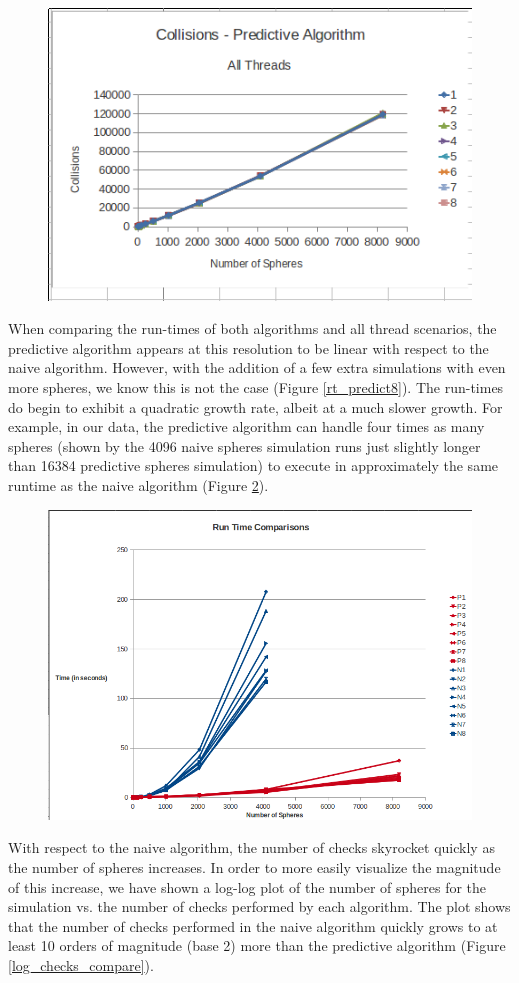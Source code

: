 \documentclass[CEJCS,PDF]{cej} %
\begin{document}
\begin{center}
\begin{figure}
	\includegraphics[width=.45\textwidth]{collisions_predictive_allthreads.png}
	\label{col_predict8}
\end{figure}
\end{center}

When comparing the run-times of both algorithms and all thread scenarios, the predictive algorithm appears at this resolution to be linear with respect to the naive algorithm.  However, with the addition of a few extra simulations with even more spheres, we know this is not the case (Figure \ref{rt_predict8}).  The run-times do begin to exhibit a quadratic growth rate, albeit at a much slower growth.  For example, in our data, the predictive algorithm can handle four times as many spheres (shown by the 4096 naive spheres simulation runs just slightly longer than 16384 predictive spheres simulation) to execute in approximately the same runtime as the naive algorithm (Figure \ref{rt_compare}).

\begin{center}
\begin{figure}
	\includegraphics[width=.45\textwidth]{runtime_comparison.png}
	\label{rt_compare}
\end{figure}
\end{center}

With respect to the naive algorithm, the number of checks skyrocket quickly as the number of spheres increases.  In order to more easily visualize the magnitude of this increase, we have shown a log-log plot of the number of spheres for the simulation vs. the number of checks performed by each algorithm.  The plot shows that the number of checks performed in the naive algorithm quickly grows to at least 10 orders of magnitude (base 2) more than the predictive algorithm (Figure \ref{log_checks_compare}).
\end{document}
